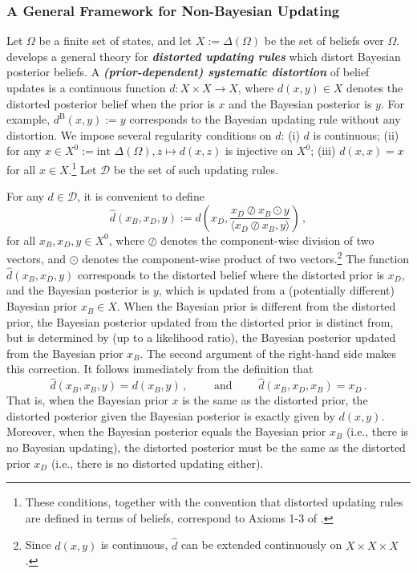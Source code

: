 \documentclass[12pt,letterpaper]{article}
\newenvironment{original}{\color{black}}{}
\theoremstyle{plain}
\theoremstyle{definition}
\theoremstyle{remark}
\theoremstyle{definition}
\begin{document}
\subsubsection{A General Framework for Non-Bayesian Updating}
\begin{original}
Let $\Omega$ be a finite set of states, and let $X:=\Delta(\Omega)$ be the set of beliefs over $\Omega$. \citet{cripps2018divisible} develops a general theory for \textit{\textbf{distorted updating rules}} which distort Bayesian posterior beliefs. A \textit{\textbf{(prior-dependent) systematic distortion}} of belief updates is a continuous function $d:X\times X \to X$, where $d(x, y) \in X$ denotes the distorted posterior belief when the prior is $x$ and the Bayesian posterior is $y$. For example, $d^{\mathrm{B}}(x, y) := y$ corresponds to the Bayesian updating rule without any distortion. We impose several regularity conditions on $d$: (i) $d$ is continuous; (ii) for any $x \in X^0:= \text{int } \Delta(\Omega), z \mapsto d(x,z)$ is injective on $X^0$; (iii) $d(x,x)=x$ for all $x \in X$.\footnote{These conditions, together with the convention that distorted updating rules are defined in terms of beliefs, correspond to Axioms 1-3 of \citet{cripps2018divisible}.} Let $\mathcal{D}$ be the set of such updating rules.

For any $d \in \mathcal{D}$, it is convenient to define
\[
\hat{d}(x_B,x_D,y):=d\left(x_D,\frac{x_D \oslash x_B \odot y}{\langle x_D \oslash x_B,y\rangle}\right)\,,
\]
for all $x_B,x_D,y \in X^0$, where $\oslash$ denotes the component-wise division of two vectors, and $\odot$ denotes the component-wise product of two vectors.\footnote{Since $d(x,y)$ is continuous, $\hat{d}$ can be extended continuously on $X \times X \times X$.} The function $\hat{d}(x_B,x_D,y)$ corresponds to the distorted belief where the distorted prior is $x_D$, and the Bayesian posterior is $y$, which is updated from a (potentially different) Bayesian prior $x_B \in X$. When the Bayesian prior is different from the distorted prior, the Bayesian posterior updated from the distorted prior is distinct from, but is determined by (up to a likelihood ratio), the Bayesian posterior updated from the Bayesian prior $x_B$. The second argument of the right-hand side makes this correction. It follows immediately from the definition that
\[
\hat{d}(x_B,x_B,y)=d(x_B,y)\,,\quad \quad \mbox{ and } \quad \quad \hat{d}(x_B,x_D,x_B)=x_D\,.
\]
That is, when the Bayesian prior $x$ is the same as the distorted prior, the distorted posterior given the Bayesian posterior is exactly given by $d(x,y)$. Moreover, when the Bayesian posterior equals the Bayesian prior $x_B$ (i.e., there is no Bayesian updating), the distorted posterior must be the same as the distorted prior $x_D$ (i.e., there is no distorted updating either).


\end{original}
\end{document}
